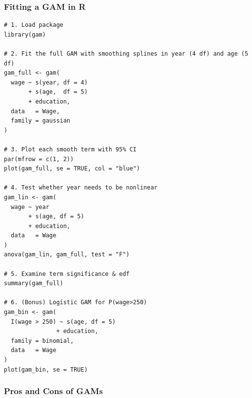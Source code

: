 \documentclass{article}
\begin{document}
\subsubsection{Fitting a GAM in R}
\begin{lstlisting}
# 1. Load package
library(gam)

# 2. Fit the full GAM with smoothing splines in year (4 df) and age (5 df)
gam_full <- gam(
  wage ~ s(year, df = 4)
       + s(age,  df = 5)
       + education,
  data   = Wage,
  family = gaussian
)

# 3. Plot each smooth term with 95% CI
par(mfrow = c(1, 2))
plot(gam_full, se = TRUE, col = "blue")

# 4. Test whether year needs to be nonlinear
gam_lin <- gam(
  wage ~ year
       + s(age, df = 5)
       + education,
  data   = Wage
)
anova(gam_lin, gam_full, test = "F")

# 5. Examine term significance & edf
summary(gam_full)

# 6. (Bonus) Logistic GAM for P(wage>250)
gam_bin <- gam(
  I(wage > 250) ~ s(age, df = 5)
               + education,
  family = binomial,
  data   = Wage
)
plot(gam_bin, se = TRUE)
\end{lstlisting}

\subsubsection{Pros and Cons of GAMs}
\end{document}
